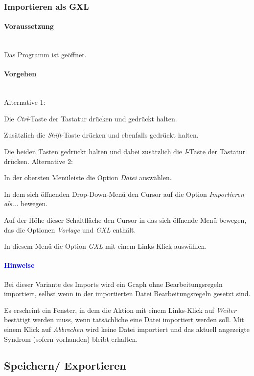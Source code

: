 \documentclass[enabledeprecatedfontcommands,fontsize=11pt,paper=a4,twoside]{scrartcl}
\newcounter{one}
\newcounter{two}[one]
\newcommand*{\hint}{\paragraph{\textcolor{blue}{Hinweise}}}
\newcommand*{\condition}{\paragraph{Voraussetzung}$\;$ \vspace{0.2cm}\\}
\newcommand*{\actions}{\paragraph{Vorgehen} $\;$\vspace{0.2cm}\\}
\newcommand*{\aOne}{\textcolor{bbe}{Alternative 1:}}
\newcommand*{\aTwo}{\textcolor{bbe}{Alternative 2:}}
\let\tempone\itemize
\let\temptwo\enditemize
\renewenvironment{itemize}{\tempone\addtolength{\itemsep}{-10.0pt}}{\temptwo}
\let\origenumerate\enumerate
\let\origendenumerate\endenumerate
\renewenvironment{enumerate}{\origenumerate \addtolength{\itemsep}{-10.0pt}}{\origendenumerate}
\begin{document}
	\subsubsection{Importieren als GXL}
		\condition 	
		Das Programm ist geöffnet.
		\actions
		\aOne
		\begin{enumerate}
				\item Die \textit{Ctrl}-Taste der Tastatur drücken und gedrückt halten.
				\item Zusätzlich die \textit{Shift}-Taste drücken und ebenfalls gedrückt halten.
				\item Die beiden Tasten gedrückt halten und dabei zusätzlich die \textit{I}-Taste der Tastatur drücken.
		\end{enumerate}				
		\aTwo
		\begin{enumerate}
				\item In der obersten Menüleiste die Option \textit{Datei} auswählen. 
				\item In dem sich öffnenden Drop-Down-Menü den Cursor auf die Option \textit{Importieren als...} bewegen.
				\item Auf der Höhe dieser Schaltfläche den Cursor in das sich öffnende Menü bewegen, das die Optionen \textit{Vorlage} und \textit{GXL} enthält.
				\item In diesem Menü die Option \textit{GXL} mit einem Links-Klick auswählen.
		\end{enumerate}		
		\hint
		\begin{itemize}
				\item Bei dieser Variante des Imports wird ein Graph ohne Bearbeitungsregeln importiert, selbst wenn in der importierten Datei Bearbeitungsregeln gesetzt sind.
				\item Es erscheint ein Fenster, in dem die Aktion mit einem Links-Klick auf \textit{Weiter} bestätigt werden muss, wenn tatsächliche eine Datei importiert werden soll. Mit einem Klick auf \textit{Abbrechen} wird keine Datei importiert und das aktuell angezeigte Syndrom (sofern vorhanden) bleibt erhalten. \\
		\end{itemize}
		
\subsection{Speichern/ Exportieren} \label{export}
\end{document}
